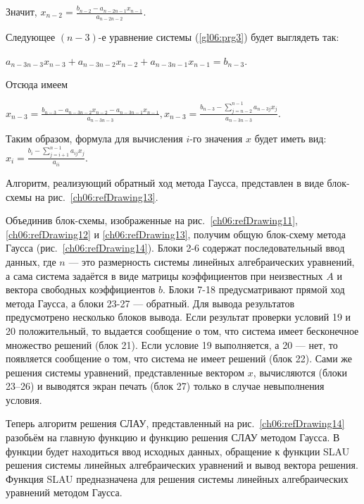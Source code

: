 Значит, $x_{n-2}=\frac{b_{n-2}-a_{n-2n-1}x_{n-1}}{a_{n-2n-2}}$.

Следующее $(n-3)$-е уравнение системы (\ref{gl06:prg3}) будет выглядеть так:

 $a_{n-3n-3}x_{n-3}+a_{n-3n-2}x_{n-2}+a_{n-3n-1}x_{n-1}=b_{n-3}$.

Отсюда имеем

 $x_{n-3}=\frac{b_{n-3}-a_{n-3n-2}x_{n-2}-a_{n-3n-1}x_{n-1}}{a_{n-3n-3}},x_{n-3}=
\frac{b_{n-3}-\sum\limits_{j=n-2}^{n-1}{a_{n-3j}x_j}}{a_{n-3n-3}}$.

Таким образом, формула для вычисления $i$-го значения $x$ будет иметь вид:
$x_i=\frac{b_i-\sum\limits_{j=i+1}^{n-1}{a_{ij}x_j}}{a_{ii}}$.

Алгоритм, реализующий обратный ход метода Гаусса, представлен в виде блок-схемы на рис.~\ref{ch06:refDrawing13}.



Объединив блок-схемы, изображенные на рис.~\ref{ch06:refDrawing11}, \ref{ch06:refDrawing12} и \ref{ch06:refDrawing13},
получим общую блок-схему метода Гаусса (рис.~\ref{ch06:refDrawing14}). Блоки 2-6 содержат последовательный ввод данных,
где $n$ --- это размерность системы линейных алгебраических уравнений, а сама система задаётся в виде матрицы коэффициентов
при неизвестных $A$ и вектора свободных коэффициентов $b$. Блоки 7-18 предусматривают прямой ход метода Гаусса, а блоки
23-27 --- обратный. Для вывода результатов предусмотрено несколько блоков вывода. Если результат проверки условий 19 и 20
положительный, то выдается сообщение о том, что система имеет бесконечное множество решений (блок 21). Если условие 19
выполняется, а 20 --- нет, то появляется сообщение о том, что система не имеет решений (блок 22). Сами же решения системы
уравнений, представленные вектором $x$, вычисляются (блоки 23–26) и выводятся экран печать (блок 27) только в случае
невыполнения условия.

Теперь алгоритм решения СЛАУ, представленный на рис.~\ref{ch06:refDrawing14} разобьём на главную функцию 
и функцию решения СЛАУ методом Гаусса. В функции  будет находиться ввод исходных данных, обращение к
функции SLAU решения системы линейных алгебраических уравнений и вывод вектора решения. Функция SLAU предназначена для
решения системы линейных алгебраических уравнений методом Гаусса.


